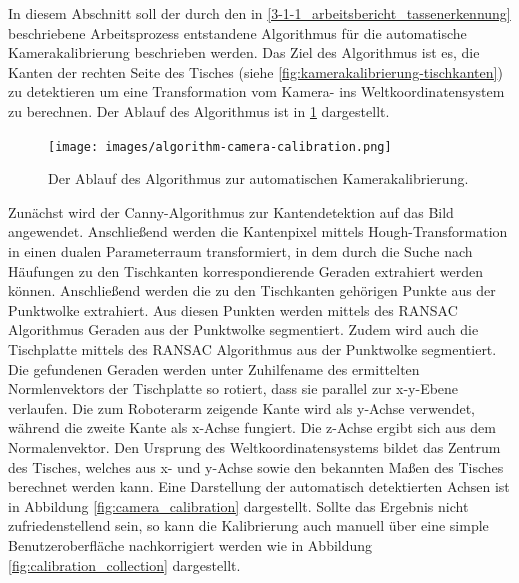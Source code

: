 In diesem Abschnitt soll der durch den in \ref{3-1-1_arbeitsbericht_tassenerkennung} beschriebene Arbeitsprozess entstandene Algorithmus für die automatische Kamerakalibrierung beschrieben werden. Das Ziel des Algorithmus ist es, die Kanten der rechten Seite des Tisches (siehe \ref{fig:kamerakalibrierung-tischkanten}) zu detektieren um eine Transformation vom Kamera- ins Weltkoordinatensystem zu berechnen. Der Ablauf des Algorithmus ist in \ref{fig:algorithmus-kamerakalibrierung} dargestellt.
\begin{figure}
	\centering
	\texttt{[image: images/algorithm-camera-calibration.png]}
	\caption{Der Ablauf des Algorithmus zur automatischen Kamerakalibrierung. \label{fig:algorithmus-kamerakalibrierung}}
\end{figure}
Zunächst wird der Canny-Algorithmus zur Kantendetektion auf das Bild angewendet. Anschließend werden die Kantenpixel mittels Hough-Transformation in einen dualen Parameterraum transformiert, in dem durch die Suche nach Häufungen zu den Tischkanten korrespondierende Geraden extrahiert werden können. Anschließend werden die zu den Tischkanten gehörigen Punkte aus der Punktwolke extrahiert. Aus diesen Punkten werden mittels des RANSAC Algorithmus Geraden aus der Punktwolke segmentiert. Zudem wird auch die Tischplatte mittels des RANSAC Algorithmus aus der Punktwolke segmentiert. Die gefundenen Geraden werden unter Zuhilfename des ermittelten Normlenvektors der Tischplatte so rotiert, dass sie parallel zur x-y-Ebene verlaufen. Die zum Roboterarm zeigende Kante wird als y-Achse verwendet, während die zweite Kante als x-Achse fungiert. Die z-Achse ergibt sich aus dem Normalenvektor. Den Ursprung des Weltkoordinatensystems bildet das Zentrum des Tisches, welches aus x- und y-Achse sowie den bekannten Maßen des Tisches berechnet werden kann. Eine Darstellung der automatisch detektierten Achsen ist in Abbildung \ref{fig:camera_calibration} dargestellt. Sollte das Ergebnis nicht zufriedenstellend sein, so kann die Kalibrierung auch manuell über eine simple Benutzeroberfläche nachkorrigiert werden wie in Abbildung \ref{fig:calibration_collection} dargestellt.
